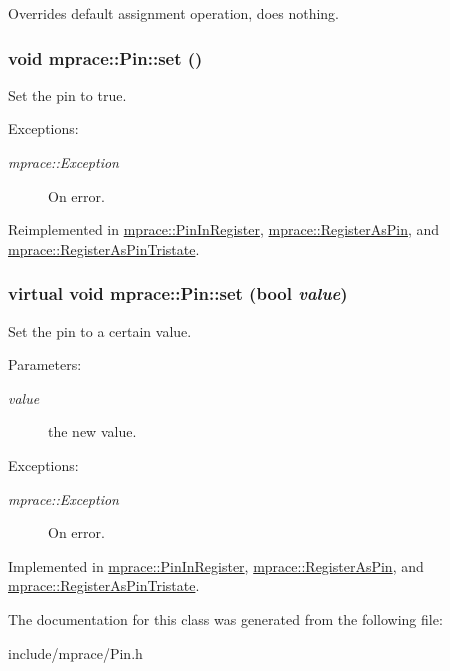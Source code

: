 Overrides default assignment operation, does nothing. 

\hypertarget{classmprace_1_1Pin_a3}{
\subsubsection[set]{\setlength{\rightskip}{0pt plus 5cm}void mprace::Pin::set ()}}
\label{classmprace_1_1Pin_a3}


Set the pin to true. 

\begin{Desc}
\item[Exceptions:]
\begin{description}
\item[{\em mprace::Exception}]On error.\end{description}
\end{Desc}


Reimplemented in \hyperlink{classmprace_1_1PinInRegister_a4}{mprace::Pin\-In\-Register}, \hyperlink{classmprace_1_1RegisterAsPin_a4}{mprace::Register\-As\-Pin}, and \hyperlink{classmprace_1_1RegisterAsPinTristate_a5}{mprace::Register\-As\-Pin\-Tristate}.\hypertarget{classmprace_1_1Pin_a1}{
\subsubsection[set]{\setlength{\rightskip}{0pt plus 5cm}virtual void mprace::Pin::set (bool {\em value})}}
\label{classmprace_1_1Pin_a1}


Set the pin to a certain value. 

\begin{Desc}
\item[Parameters:]
\begin{description}
\item[{\em value}]the new value. \end{description}
\end{Desc}
\begin{Desc}
\item[Exceptions:]
\begin{description}
\item[{\em mprace::Exception}]On error.\end{description}
\end{Desc}


Implemented in \hyperlink{classmprace_1_1PinInRegister_a2}{mprace::Pin\-In\-Register}, \hyperlink{classmprace_1_1RegisterAsPin_a2}{mprace::Register\-As\-Pin}, and \hyperlink{classmprace_1_1RegisterAsPinTristate_a2}{mprace::Register\-As\-Pin\-Tristate}.

The documentation for this class was generated from the following file:\begin{CompactItemize}
\item 
include/mprace/Pin.h\end{CompactItemize}
